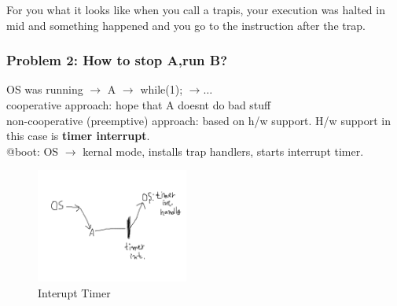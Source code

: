For you what it looks like when you call a trapis,
your execution was halted in mid
and something happened and you go to the instruction after the
trap.\\

\subsubsection{Problem 2: How to stop A,run B?}

OS was running $\rightarrow$ A $\rightarrow$ while(1);
$\rightarrow \dots$\\

cooperative approach: hope that A doesnt do bad stuff\\

non-cooperative (preemptive) approach: based on h/w support. H/w
support in this case is \textbf{timer interrupt}.\\

@boot: OS $\rightarrow$ kernal mode, installs trap handlers, starts
interrupt timer.

\begin{figure}[h!]
    \begin{center}
        \includegraphics[width=5cm]{img/interupttimer.png}
        \caption{Interupt Timer}
    \end{center}
\end{figure}
